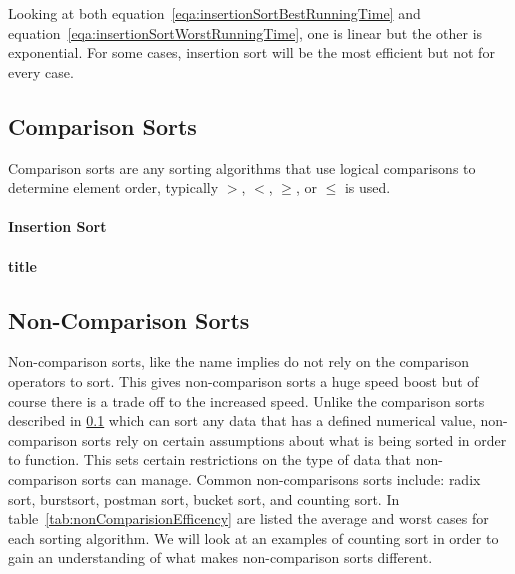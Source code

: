 \documentclass[12pt]{article}
\begin{document}
	
	
	Looking at both equation~\ref{eqa:insertionSortBestRunningTime} and equation~\ref{eqa:insertionSortWorstRunningTime}, one is linear but the other is exponential.
	For some cases, insertion sort will be the most efficient but not for every case.
	
	\subsection{Comparison Sorts}
	\label{CompSort}
	Comparison sorts are any sorting algorithms that use logical comparisons to determine element order, typically $>$, $<$, $\ge$, or $\le$ is used.
	
	\paragraph{Insertion Sort}
	
	
	\paragraph{title}
	
	
	
	\subsection{Non-Comparison Sorts}
	
	Non-comparison sorts, like the name implies do not rely on the comparison operators to sort.
	This gives non-comparison sorts a huge speed boost but of course there is a trade off to the increased speed.
	Unlike the comparison sorts described in \ref{CompSort} which can sort any data that has a defined numerical value, non-comparison sorts rely on certain assumptions about what is being sorted in order to function.
	This sets certain restrictions on the type of data that non-comparison sorts can manage.
	Common non-comparisons sorts include: radix sort, burstsort, postman sort, bucket sort, and counting sort.
	In table~\ref{tab:nonComparisionEfficency} are listed the average and worst cases for each sorting algorithm.
	We will look at an examples of counting sort  in order to gain an understanding of what makes non-comparison sorts different.

	
\end{document}
